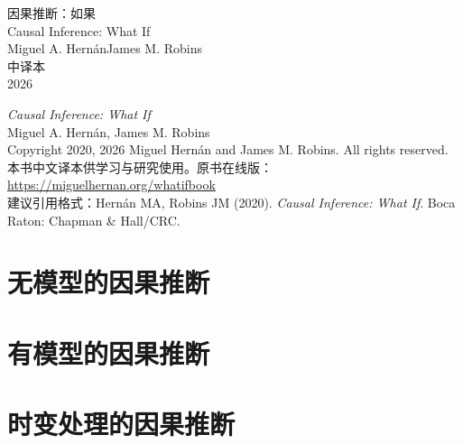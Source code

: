 \documentclass[UTF8,11pt,openany,fontset=windows]{ctexbook}
\begin{document}
\begin{titlepage}
\thispagestyle{empty}
\centering
\vspace*{4.2cm}
{\heiti{} 因果推断：如果}\\[0.6cm]
{\heiti{} Causal Inference: What If}\\[2.4cm]
{ Miguel A. Hernán\quad James M. Robins}\\[0.4cm]
{ 中译本}\\[3.6cm]
{ 2026}
\vfill
\end{titlepage}

\thispagestyle{empty}
\vspace*{\fill}
{\small
\noindent\textit{Causal Inference: What If}\\
Miguel A. Hernán, James M. Robins\\
Copyright 2020, 2026 Miguel Hernán and James M. Robins. All rights reserved.\\[0.6em]
\noindent 本书中文译本供学习与研究使用。原书在线版：\url{https://miguelhernan.org/whatifbook}\\[0.6em]
\noindent 建议引用格式：Hernán MA, Robins JM (2020). \textit{Causal Inference: What If}. Boca Raton: Chapman \& Hall/CRC.
}
\vspace*{\fill}
\clearpage

\frontmatter
\pagestyle{plain}
\tableofcontents



\mainmatter
\pagestyle{fancy}

\part{无模型的因果推断}











\part{有模型的因果推断}









\part{时变处理的因果推断}






\backmatter


\end{document}
